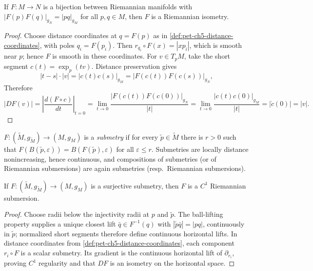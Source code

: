 \begin{theorem}
  \label{thm:pet-ch5-myers-steenrod-isometry}

  If $F:M\to N$ is a bijection between Riemannian manifolds with
  $|F(p)F(q)|_{g_N}=|pq|_{g_M}$ for all $p,q\in M$, then $F$ is a Riemannian
  isometry.
\end{theorem}
\begin{proof}
  \sketch
  Choose distance coordinates at $q=F(p)$ as in
  \cref{def:pet-ch5-distance-coordinates}, with poles $q_i=F(p_i)$.  Then
  $r_{q_i}\circ F(x)=|xp_i|$, which is smooth near $p$; hence $F$ is smooth in
  these coordinates.  For $v\in T_pM$, take the short segment
  $c(t)=\exp_p(tv)$.  Distance preservation gives
  \[
    |t-s|\cdot|v|=|c(t)c(s)|_{g_M}=|F(c(t))F(c(s))|_{g_N},
  \]
  Therefore
  \[
    |DF(v)|=\left|\frac{d(F\circ c)}{dt}\right|_{t=0}
    =\lim_{t\to0}\frac{|F(c(t))F(c(0))|_{g_N}}{|t|}
    =\lim_{t\to0}\frac{|c(t)c(0)|_{g_M}}{|t|}=|\dot c(0)|=|v|.
  \]
\end{proof}

\begin{definition}[submetry]
  \label{def:pet-ch5-submetry}


  $F:(\tilde M,g_{\tilde M})\to(M,g_M)$ is a \emph{submetry} if for every
  $\tilde p\in\tilde M$ there is $r>0$ such that $F(B(\tilde p,\varepsilon))=
  B(F(\tilde p),\varepsilon)$ for all $\varepsilon\le r$. Submetries are locally
  distance nonincreasing, hence continuous, and compositions of submetries (or of
  Riemannian submersions) are again submetries (resp.\ Riemannian submersions).
\end{definition}

\begin{theorem}
  \label{thm:pet-ch5-berestovskii-submetry}

  If $F:(\tilde M,g_{\tilde M})\to(M,g_M)$ is a surjective submetry, then $F$ is a
  $C^1$ Riemannian submersion.
\end{theorem}
\begin{proof}
  \sketch
  Choose radii below the injectivity radii at $p$ and $\tilde p$.  The ball-lifting
  property supplies a unique closest lift $\bar q\in F^{-1}(q)$ with
  $|\tilde p\bar q|=|pq|$, continuously in $\tilde p$; normalized short segments
  therefore define continuous horizontal lifts.  In distance coordinates from
  \cref{def:pet-ch5-distance-coordinates}, each component $r_i\circ F$ is a scalar
  submetry.  Its gradient is the continuous horizontal lift of $\partial_{r_i}$,
  proving $C^1$ regularity and that $DF$ is an isometry on the horizontal space.
\end{proof}

